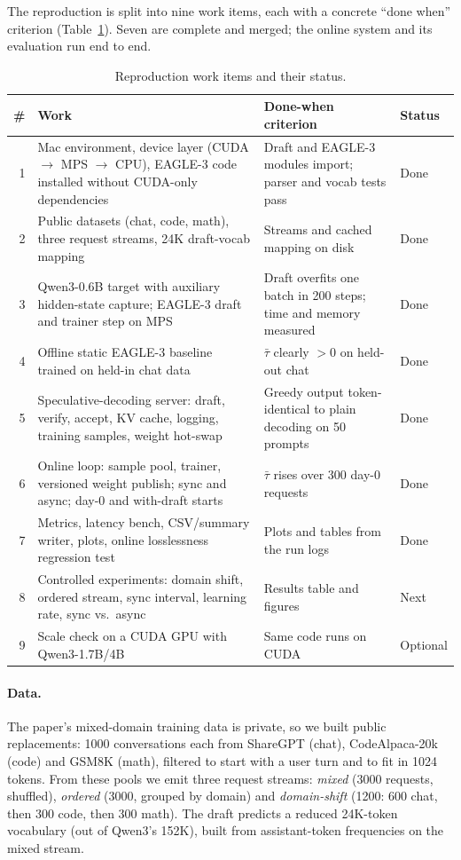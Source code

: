 \documentclass[11pt]{article}
\newcommand{\taubar}{\bar{\tau}}
\begin{document}
The reproduction is split into nine work items, each with a concrete ``done when'' criterion
(Table~\ref{tab:progress}). Seven are complete and merged; the online system and its evaluation run end to end.

\begin{table}[t]
\centering\small
\caption{Reproduction work items and their status.}
\label{tab:progress}
\footnotesize\begin{tabular}{@{}rp{7.9cm}p{5.8cm}l@{}}
\toprule
\# & Work & Done-when criterion & Status \\
\midrule
1 & Mac environment, device layer (CUDA $\to$ MPS $\to$ CPU), EAGLE-3 code installed without CUDA-only dependencies
  & Draft and EAGLE-3 modules import; parser and vocab tests pass & Done \\
2 & Public datasets (chat, code, math), three request streams, 24K draft-vocab mapping
  & Streams and cached mapping on disk & Done \\
3 & Qwen3-0.6B target with auxiliary hidden-state capture; EAGLE-3 draft and trainer step on MPS
  & Draft overfits one batch in 200 steps; time and memory measured & Done \\
4 & Offline static EAGLE-3 baseline trained on held-in chat data
  & $\taubar$ clearly $>0$ on held-out chat & Done \\
5 & Speculative-decoding server: draft, verify, accept, KV cache, logging, training samples, weight hot-swap
  & Greedy output token-identical to plain decoding on 50 prompts & Done \\
6 & Online loop: sample pool, trainer, versioned weight publish; sync and async; day-0 and with-draft starts
  & $\taubar$ rises over 300 day-0 requests & Done \\
7 & Metrics, latency bench, CSV/summary writer, plots, online losslessness regression test
  & Plots and tables from the run logs & Done \\
\midrule
8 & Controlled experiments: domain shift, ordered stream, sync interval, learning rate, sync vs.\ async
  & Results table and figures & Next \\
9 & Scale check on a CUDA GPU with Qwen3-1.7B/4B & Same code runs on CUDA & Optional \\
\bottomrule
\end{tabular}
\end{table}

\paragraph{Data.} The paper's mixed-domain training data is private, so we built public replacements: 1000
conversations each from ShareGPT (chat), CodeAlpaca-20k (code) and GSM8K (math), filtered to start with a user
turn and to fit in 1024 tokens. From these pools we emit three request streams: \emph{mixed} (3000 requests,
shuffled), \emph{ordered} (3000, grouped by domain) and \emph{domain-shift} (1200: 600 chat, then 300 code, then
300 math). The draft predicts a reduced 24K-token vocabulary (out of Qwen3's 152K), built from assistant-token
frequencies on the mixed stream.
\end{document}
